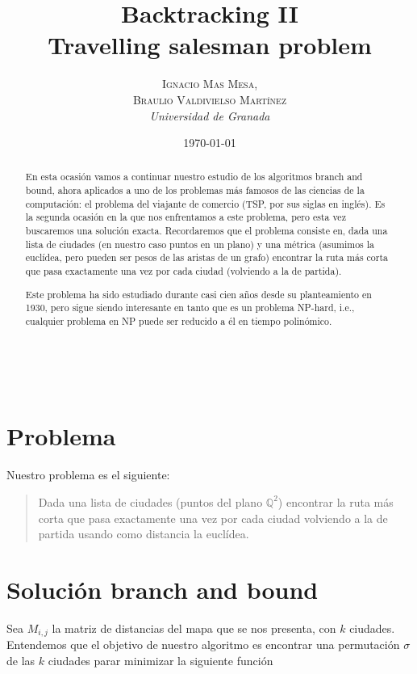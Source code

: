 \documentclass[a4paper, 11pt]{article}
\title{\textbf{Backtracking II}\\ %
Travelling salesman problem} %
\author{\textsc{Ignacio Mas Mesa,\\Braulio Valdivielso Martínez} %
\\{\textit{Universidad de Granada}}} %
\date{\today} %
\makeatletter
\renewcommand{\maketitle}{
  \begin{flushright} %
  
  {\LARGE\@title} %
  
  \vspace{50pt} %
  
  {\large\@author} %
  \\\@date %
  \vspace{40pt} %
  \end{flushright}
}
\makeatother
\begin{document}
\maketitle %

\renewcommand{\abstractname}{Abstract} %
\begin{abstract}
En esta ocasión vamos a continuar nuestro estudio de los algoritmos branch and bound, ahora aplicados a uno de los problemas más famosos de las ciencias de la computación: el problema del viajante de comercio (TSP, por sus siglas en inglés). Es la segunda ocasión en la que nos enfrentamos a este problema, pero esta vez buscaremos una solución exacta. Recordaremos que el problema consiste en, dada una lista de ciudades (en nuestro caso puntos en un plano) y una métrica (asumimos la euclídea, pero pueden ser pesos de las aristas de un grafo) encontrar la ruta más corta que pasa exactamente una vez por cada ciudad (volviendo a la de partida).

Este problema ha sido estudiado durante casi cien años desde su planteamiento en 1930, pero sigue siendo interesante en tanto que es un problema NP-hard, i.e., cualquier problema en NP puede ser reducido a él en tiempo polinómico.
\end{abstract}

\vspace{30pt} %


  \tableofcontents

\pagebreak


\section{Problema}
Nuestro problema es el siguiente:
\begin{quote}
Dada una lista de ciudades (puntos del plano ${\mathbb Q}^2$) encontrar la ruta más corta que pasa exactamente una vez por cada ciudad volviendo a la de partida usando como distancia la euclídea.
\end{quote}

\section{Solución branch and bound}
Sea $M_{i,j}$ la matriz de distancias del mapa que se nos presenta, con $k$ ciudades. Entendemos que el objetivo de nuestro algoritmo es encontrar una permutación $\sigma$ de las $k$ ciudades parar minimizar la siguiente función
\end{document}
